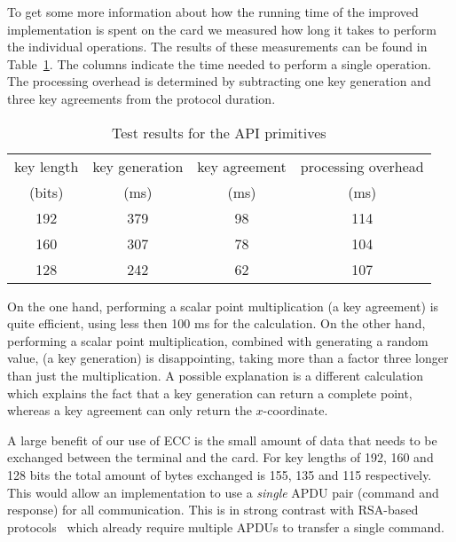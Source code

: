 To get some more information about how the running time of the improved
implementation is spent on the card we measured how long it takes to perform the
individual operations. The results of these measurements can be found in
Table~\ref{tab:primitives}. The columns indicate the time needed to perform a
single operation. The processing overhead is determined by subtracting one key
generation and three key agreements from the protocol duration.

\begin{table}
  \centering
  \caption{Test results for the API primitives}
  \label{tab:primitives}
  \renewcommand{\tabcolsep}{1.25mm}
  \renewcommand{\arraystretch}{1.25}
  \begin{tabular}{| c || c | c | c |}\hline
    key length & key generation & key agreement & processing overhead \\
    (bits) & (ms) & (ms) & (ms) \\\hline
    \hline
    192 & 379 & 98 & 114 \\\hline
    160 & 307 & 78 & 104 \\\hline
    128 & 242 & 62 & 107 \\\hline
  \end{tabular}
\end{table}

On the one hand, performing a scalar point multiplication (a key agreement) is
quite efficient, using less then 100 ms for the calculation. On the other hand,
performing a scalar point multiplication, combined with generating a random
value, (a key generation) is disappointing, taking more than a factor three
longer than just the multiplication. A possible explanation is a different
calculation which explains the fact that a key generation can return a complete
point, whereas a key agreement can only return the $x$-coordinate.

A large benefit of our use of ECC is the small amount of data that needs to be
exchanged between the terminal and the card. For key lengths of 192, 160 and 128
bits the total amount of bytes exchanged is 155, 135 and 115 respectively. This
would allow an implementation to use a \emph{single} APDU pair (command and
response) for all communication. This is in strong contrast with RSA-based
protocols~\cite{Sterckx09,TewsJacobs09} which already require multiple APDUs to
transfer a single command.

%
%
